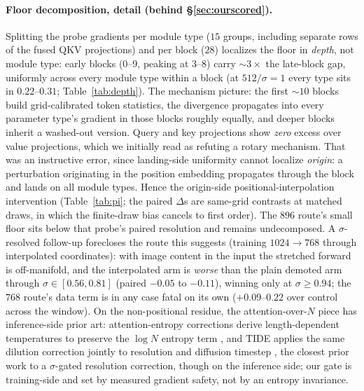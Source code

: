 \paragraph{Floor decomposition, detail (behind
\S\ref{sec:ourscored}).} Splitting the probe gradients per module type
($15$ groups, including separate rows of the fused QKV projections) and
per block ($28$) localizes the floor in \emph{depth}, not module type:
early blocks (0--9, peaking at 3--8) carry ${\sim}3\times$ the
late-block gap, uniformly across every module type within a block (at
$512/\sigma{=}1$ every type sits in $0.22$--$0.31$;
Table~\ref{tab:depth}). The mechanism picture: the first ${\sim}10$
blocks build grid-calibrated token statistics, the divergence
propagates into every parameter type's gradient in those blocks roughly
equally, and deeper blocks inherit a washed-out version. Query and key
projections show \emph{zero} excess over value projections, which we
initially read as refuting a rotary mechanism. That was an instructive
error, since landing-side uniformity cannot localize \emph{origin}: a
perturbation originating in the position embedding propagates through
the block and lands on all module types. Hence the origin-side
positional-interpolation intervention (Table~\ref{tab:pi}; the paired
$\Delta$s are same-grid contrasts at matched draws, in which the
finite-draw bias cancels to first order). The $896$ route's small floor
sits below that probe's paired resolution and remains undecomposed. A
$\sigma$-resolved follow-up forecloses the route this suggests
(training $1024{\to}768$ through interpolated coordinates): with image
content in the input the stretched forward is off-manifold, and the
interpolated arm is \emph{worse} than the plain demoted arm through
$\sigma \in [0.56, 0.81]$ (paired $-0.05$ to $-0.11$), winning only at
$\sigma \ge 0.94$; the $768$ route's data term is in any case fatal on
its own ($+0.09$--$0.22$ over control across the window). On the
non-positional residue, the attention-over-$N$ piece has inference-side
prior art: attention-entropy corrections derive length-dependent
temperatures to preserve the $\log N$ entropy term
\citep{li2025infoscale}, and TIDE applies the same dilution correction
jointly to resolution and diffusion timestep \citep{liu2026tide},
the closest prior work to a $\sigma$-gated resolution correction,
though on the inference side; our gate is training-side and set by
measured gradient safety, not by an entropy invariance.

